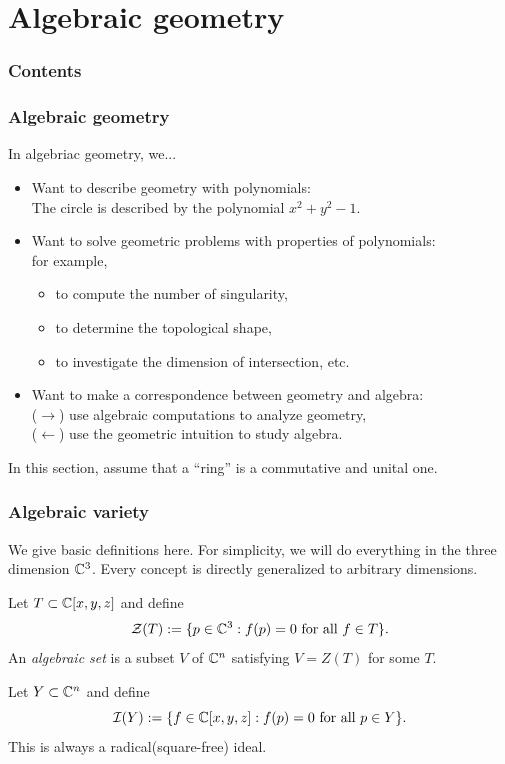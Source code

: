 \documentclass[10pt,handout]{beamer}
\begin{document}
\section{Algebraic geometry}
\begin{frame}
\frametitle{Contents}
  \tableofcontents[currentsection]
\end{frame}

\begin{frame}
\frametitle{Algebraic geometry}
  In algebriac geometry, we...
  \begin{itemize}
    \pause\item Want to describe geometry with polynomials:\\
      \quad The circle is described by the polynomial $x^2+y^2-1$.
    \pause\item Want to solve geometric problems with properties of polynomials:\\
      for example,
      \begin{itemize}
        \item to compute the number of singularity,
        \item to determine the topological shape,
        \item to investigate the dimension of intersection, etc.
      \end{itemize}
    \pause\item Want to make a correspondence between geometry and algebra:\\
      ($\to$) use algebraic computations to analyze geometry,\\
      ($\leftarrow$) use the geometric intuition to study algebra.
  \end{itemize}
  \pause In this section, assume that a ``ring'' is a commutative and unital one.
\end{frame}

\begin{frame}
\frametitle{Algebraic variety}
  \begin{rmk}
  We give basic definitions here.
  For simplicity, we will do everything in the three dimension $\mathbb{C}^3$.
  Every concept is directly generalized to arbitrary dimensions.
  \end{rmk}
  \pause
  \begin{defn}
    Let $T\subset\mathbb{C}[x,y,z]$ and define
    \[\mathcal{Z}(T):=\{p\in\mathbb{C}^3:f(p)=0\text{ for all }f\in T\}.\]
    An \emph{algebraic set} is a subset $V$ of $\mathbb{C}^n$ satisfying $V=Z(T)$ for some $T$.
  \end{defn}
  \pause
  \begin{defn}
    Let $Y\subset\mathbb{C}^n$ and define
    \[\mathcal{I}(Y):=\{f\in\mathbb{C}[x,y,z]:f(p)=0\text{ for all }p\in Y\}.\]
    This is always a radical(square-free) ideal.
  \end{defn}
\end{frame}
\end{document}
